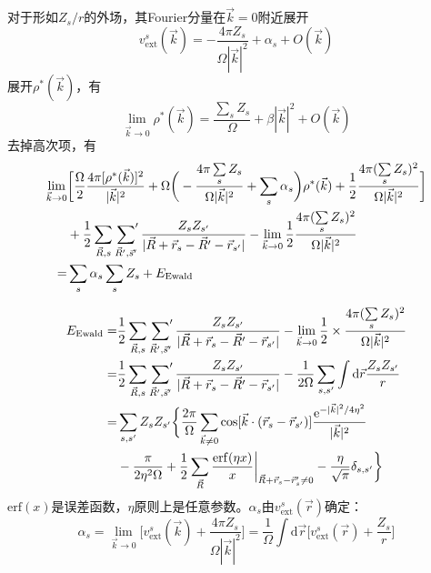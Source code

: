 {对于形如$Z_s/r$的外场，其\textrm{Fourier}分量在$\vec k=0$附近展开
	\begin{equation}
		v_{\mathrm{ext}}^s(\vec k)=-\dfrac{4\pi Z_s}{\Omega|\vec k|^2}+\alpha_s+O(\vec k)
	\end{equation}
	展开$\rho^{\ast}(\vec k)$，有
	\begin{equation}
		\lim_{\vec k\rightarrow 0}\rho^{\ast}(\vec k)=\dfrac{\sum_sZ_s}{\Omega}+\beta|\vec k|^2+O(\vec k)
	\end{equation}
去掉高次项，有
\begin{equation}
	\begin{aligned}
		\lim_{\vec k\rightarrow 0}&\bigg[\dfrac{\Omega}2\dfrac{4\pi[\rho^{\ast}(\vec k)]^2}{|\vec k|^2}+\Omega\bigg(-\dfrac{4\pi\sum\limits_sZ_s}{\Omega|\vec k|^2}+\sum\limits_s\alpha_s\bigg)\rho^{\ast}(\vec k)+\dfrac12\dfrac{4\pi(\sum\limits_sZ_s)^2}{\Omega|\vec k|^2}\bigg]\\
		&+\dfrac12\sum_{\vec R,s}\sideset{}{^{\prime}}\sum_{\vec R^{\prime},\vec s^{\prime}}\dfrac{Z_sZ_{s^{\prime}}}{|\vec R+\vec r_s-\vec R^{\prime}-\vec r_{s^{\prime}}|}-\lim_{\vec k\rightarrow0}\dfrac12\dfrac{4\pi(\sum\limits_sZ_s)^2}{\Omega|\vec k|^2}\\
		=&\sum_s\alpha_s\sum_sZ_s+E_{\mathrm{Ewald}}
	\end{aligned}
\end{equation}

	\begin{equation}
		\begin{aligned}
			E_{\textrm{Ewald}}=&\dfrac12\sum_{\vec R,s}\sideset{}{^{\prime}}\sum_{\vec R^{\prime},\vec s^{\prime}}\dfrac{Z_sZ_{s^{\prime}}}{|\vec R+\vec r_s-\vec R^{\prime}-\vec r_{s^{\prime}}|}-\lim_{\vec k\rightarrow0}\dfrac12\times\dfrac{4\pi(\sum\limits_sZ_s)^2}{\Omega|\vec k|^2}\\
			=&\dfrac12\sum_{\vec R,s}\sideset{}{^{\prime}}\sum_{\vec R^{\prime},\vec s^{\prime}}\dfrac{Z_sZ_{s^{\prime}}}{|\vec R+\vec r_s-\vec R^{\prime}-\vec r_{s^{\prime}}|}-\dfrac1{2\Omega}\sum_{s,s^{\prime}}\int\mathrm{d}\vec r\dfrac{Z_sZ_{s^{\prime}}}r\\
			=&\sum_{s,s^{\prime}}Z_sZ_{s^{\prime}}\bigg\{\dfrac{2\pi}{\Omega}\sum_{\vec k\neq 0}\cos[\vec k\cdot(\vec r_s-\vec r_{s^{\prime}})]\dfrac{\mathrm{e}^{-|\vec k|^2/4\eta^2}}{|\vec k|^2}\\
			&-\dfrac{\pi}{2\eta^2\Omega}+\dfrac12\sum_{\vec R}\dfrac{\mathrm{erf}(\eta x)}x\bigg|_{\vec R+\vec r_s-\vec r_s^{\prime}\neq0}-\dfrac{\eta}{\sqrt{\pi}}\delta_{s,s^{\prime}}\bigg\}
		\end{aligned}
	\end{equation}
	$\mathrm{erf}(x)$是误差函数，$\eta$原则上是任意参数。$\alpha_s$由$v_{\mathrm{ext}}^s(\vec r)$确定：
	\begin{equation}
		\alpha_s=\lim_{\vec k\rightarrow0}\bigg[v_{\mathrm{ext}}^s(\vec k)+\dfrac{4\pi Z_s}{\Omega|\vec k|^2}\bigg]=\dfrac1{\Omega}\int\mathrm{d}\vec r\bigg[v_{\mathrm{ext}}^s(\vec r)+\dfrac{Z_s}r\bigg]
	\end{equation}

}
